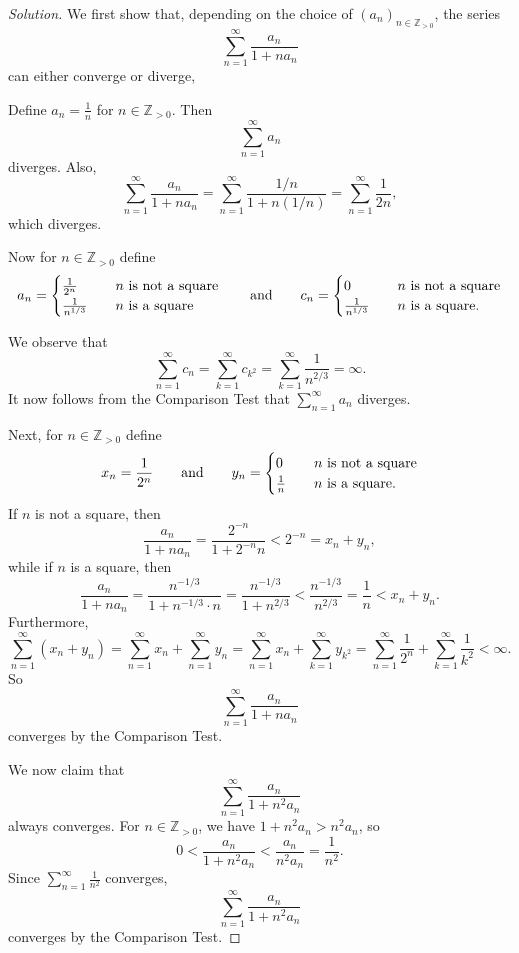 \documentclass[10pt]{amsart}
\newcommand{\I}{\infty}
\newcommand{\andeqn}{\qquad {\mbox{and}} \qquad}
\theoremstyle{definition}
\newcommand{\N}{{\mathbb{Z}}_{> 0}}
\begin{document}
\begin{proof}[Solution]
We first show that, depending on the choice of $(a_n)_{n \in \N}$,
the series
\[
\sum_{n = 1}^{\infty} \frac{a_n}{1 + n a_n}
\]
can either converge or diverge,

Define $a_n = \frac{1}{n}$ for $n \in \N$.
Then
\[
\sum_{n = 1}^{\infty} a_n
\]
diverges.
Also,
\[
\sum_{n = 1}^{\infty} \frac{a_n}{1 + n a_n}
  = \sum_{n = 1}^{\infty} \frac{1/n}{1 + n (1/n)}
  = \sum_{n = 1}^{\infty} \frac{1}{2 n},
\]
which diverges.

Now for $n \in \N$ define
\[
a_n = \begin{cases}
   \frac{1}{2^n}     & \hspace*{1em} {\mbox{$n$ is not a square}}
        \\
   \frac{1}{n^{1/3}} & \hspace*{1em} {\mbox{$n$ is a square}}
\end{cases}
\andeqn
c_n = \begin{cases}
   0                 & \hspace*{1em} {\mbox{$n$ is not a square}}
        \\
   \frac{1}{n^{1/3}} & \hspace*{1em} {\mbox{$n$ is a square}}.
\end{cases}
\]

We observe that
\[
\sum_{n = 1}^{\infty} c_n
 = \sum_{k = 1}^{\infty} c_{k^2}
 = \sum_{k = 1}^{\infty} \frac{1}{n^{2/3}}
 = \I.
\]
It now follows from the Comparison Test
that
$\sum_{n = 1}^{\infty} a_n$ diverges.

Next, for $n \in \N$ define
\[
x_n = \frac{1}{2^n}
\andeqn
y_n = \begin{cases}
   0           & \hspace*{1em} {\mbox{$n$ is not a square}}
        \\
   \frac{1}{n} & \hspace*{1em} {\mbox{$n$ is a square}}.
\end{cases}
\]
If $n$ is not a square,
then
\[
\frac{a_n}{1 + n a_n}
 = \frac{2^{-n}}{1 + 2^{-n} n}
 < 2^{-n}
 = x_n + y_n,
\]
while if $n$ is a square,
then
\[
\frac{a_n}{1 + n a_n}
 = \frac{n^{- 1/3}}{1 + n^{- 1/3} \cdot n}
 = \frac{n^{- 1/3}}{1 + n^{2/3}}
 <  \frac{n^{- 1/3}}{n^{2/3}}
 = \frac{1}{n}
 < x_n + y_n.
\]
Furthermore,
\[
\sum_{n = 1}^{\infty} (x_n + y_n)
 = \sum_{n = 1}^{\infty} x_n + \sum_{n = 1}^{\infty} y_n
 = \sum_{n = 1}^{\infty} x_n + \sum_{k = 1}^{\infty} y_{k^2}
 = \sum_{n = 1}^{\infty} \frac{1}{2^n}
    + \sum_{k = 1}^{\infty} \frac{1}{k^2}
 < \I.
\]
So
\[
\sum_{n = 1}^{\infty} \frac{a_n}{1 + n a_n}
\]
converges by the Comparison Test.

We now claim that
\[
\sum_{n = 1}^{\infty} \frac{a_n}{1 + n^2 a_n}
\]
always converges.
For $n \in \N$,
we have
$1 + n^2 a_n > n^2 a_n$,
so
\[
0 < \frac{a_n}{1 + n^2 a_n}
  < \frac{a_n}{n^2 a_n}
  = \frac{1}{n^2}.
\]
Since $\sum_{n = 1}^{\infty} \frac{1}{n^2}$ converges,
\[
\sum_{n = 1}^{\infty} \frac{a_n}{1 + n^2 a_n}
\]
converges by the Comparison Test.
\end{proof}
\end{document}
